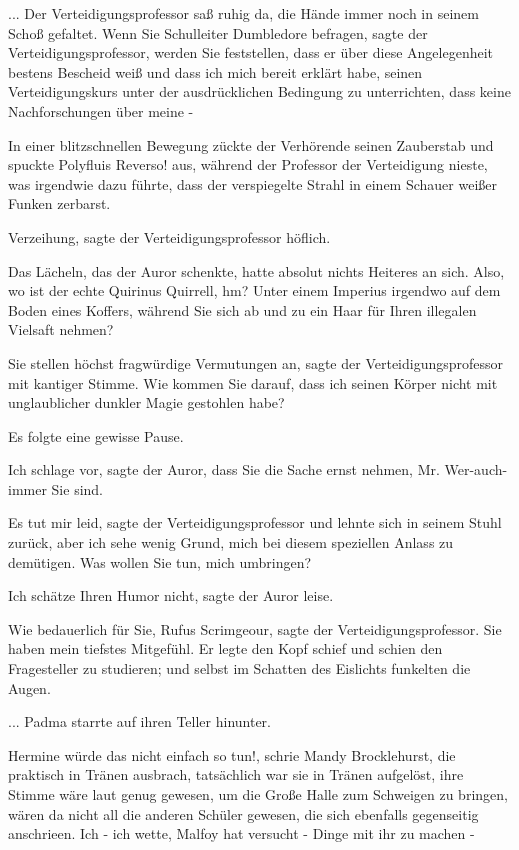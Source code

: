 ... Der Verteidigungsprofessor saß ruhig da, die Hände immer noch in seinem
Schoß gefaltet. \glqq{}Wenn Sie Schulleiter Dumbledore befragen\grqq{}, sagte der
Verteidigungsprofessor, \glqq{}werden Sie feststellen, dass er über diese
Angelegenheit bestens Bescheid weiß und dass ich mich bereit erklärt habe,
seinen Verteidigungskurs unter der ausdrücklichen Bedingung zu unterrichten,
dass keine Nachforschungen über meine -\grqq{}

In einer blitzschnellen Bewegung zückte der Verhörende seinen Zauberstab und
spuckte \glqq{}Polyfluis Reverso!\grqq{} aus, während der Professor der
Verteidigung nieste, was irgendwie dazu führte, dass der verspiegelte Strahl in
einem Schauer weißer Funken zerbarst.

\glqq{}Verzeihung\grqq{}, sagte der Verteidigungsprofessor höflich.

Das Lächeln, das der Auror schenkte, hatte absolut nichts Heiteres an sich.
\glqq{}Also, wo ist der echte Quirinus Quirrell, hm? Unter einem Imperius
irgendwo auf dem Boden eines Koffers, während Sie sich ab und zu ein Haar für
Ihren illegalen Vielsaft nehmen?\grqq{}

\glqq{}Sie stellen höchst fragwürdige Vermutungen an\grqq{}, sagte der
Verteidigungsprofessor mit kantiger Stimme. \glqq{}Wie kommen Sie darauf, dass
ich seinen Körper nicht mit unglaublicher dunkler Magie gestohlen habe?\grqq{}

Es folgte eine gewisse Pause.

\glqq{}Ich schlage vor\grqq{}, sagte der Auror, \glqq{}dass Sie die Sache ernst
nehmen, Mr. Wer-auch-immer Sie sind.\grqq{}

\glqq{}Es tut mir leid\grqq{}, sagte der Verteidigungsprofessor und lehnte sich
in seinem Stuhl zurück, \glqq{}aber ich sehe wenig Grund, mich bei diesem
speziellen Anlass zu demütigen. Was wollen Sie tun, mich umbringen?\grqq{}

\glqq{}Ich schätze Ihren Humor nicht\grqq{}, sagte der Auror leise.

\glqq{}Wie bedauerlich für Sie, Rufus Scrimgeour\grqq{}, sagte der
Verteidigungsprofessor. \glqq{}Sie haben mein tiefstes Mitgefühl.\grqq{} Er legte
den Kopf schief und schien den Fragesteller zu studieren; und selbst im Schatten
des Eislichts funkelten die Augen.

... Padma starrte auf ihren Teller hinunter.

\glqq{}Hermine würde das nicht einfach so tun!\grqq{}, schrie Mandy Brocklehurst,
die praktisch in Tränen ausbrach, tatsächlich war sie in Tränen aufgelöst, ihre
Stimme wäre laut genug gewesen, um die Große Halle zum Schweigen zu bringen,
wären da nicht all die anderen Schüler gewesen, die sich ebenfalls gegenseitig
anschrieen. \glqq{}Ich - ich wette, Malfoy hat versucht - Dinge mit ihr zu machen
-\grqq{}


